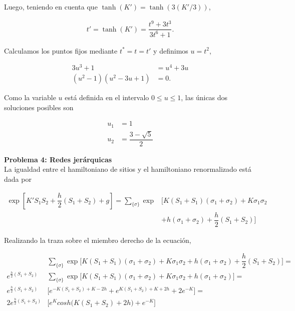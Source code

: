 \documentclass[10pt]{article}
\begin{document}
Luego, teniendo en cuenta que $\tanh(K') = \tanh(3(K'/3))$,

\begin{align}
t' = \tanh(K') =  \dfrac{t^9 + 3 t^3}{3 t^6 + 1}.
\end{align}

Calculamos los puntos fijos mediante $t^*=t=t'$ y definimos $u=t^2$,

\begin{align}
3u^3+1 &= u^4 + 3 u \\
(u^2-1)(u^2-3u+1) &= 0.
\end{align}

Como la variable $u$ est\'a definida en el intervalo $0 \leq u \leq 1$, las \'unicas dos soluciones posibles son

\begin{align*}
u_1 &= 1 \\
u_2 &= \dfrac{3-\sqrt{5}}{2}
\end{align*}

\pagebreak

\textbf{Problema 4: Redes jer\'arquicas}\\

La igualdad entre el hamiltoniano de sitios y el hamiltoniano renormalizado est\'a dada por 

\begin{align*}
\exp \left[ K' S_1 S_2 + \dfrac{h}{2}\left( S_1 + S_2\right) +g \right] = \sum_{\lbrace \sigma \rbrace} \exp &\bigg[ K(S_1 + S_1) (\sigma_1 + \sigma_2) + K \sigma_1 \sigma_2 \\
&+ h (\sigma_1 + \sigma_2) + \dfrac{h}{2} (S_1 + S_2) \bigg]
\end{align*}

Realizando la traza sobre el miembro derecho de la ecuaci\'on,

\begin{align*}
&\sum_{\lbrace \sigma \rbrace} \exp \bigg[ K(S_1 + S_1) (\sigma_1 + \sigma_2) + K \sigma_1 \sigma_2 + h (\sigma_1 + \sigma_2) + \dfrac{h}{2} (S_1 + S_2) \bigg] = \\
e^{\frac{h}{2} (S_1 + S_2)}  &\sum_{\lbrace \sigma \rbrace} \exp \bigg[ K(S_1 + S_1) (\sigma_1 + \sigma_2) + K \sigma_1 \sigma_2 + h (\sigma_1 + \sigma_2) \bigg] = \\
e^{\frac{h}{2} (S_1 + S_2)} &\bigg[ e^{-K(S_1+S_2)+K-2h} + e^{K(S_1+S_2)+K+2h} + 2e^{-K} \bigg] = \\
2 e^{\frac{h}{2} (S_1 + S_2)}  &\bigg[ e^{K} cosh\bigg( K(S_1+S_2) + 2h \bigg) + e^{-K}\bigg]
\end{align*}
\end{document}
